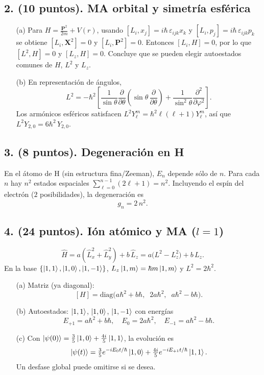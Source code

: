 \documentclass[a4paper,11pt]{article}
\begin{document}
\subsection*{2. (10 puntos). MA orbital y simetría esférica}
\begin{enumerate}
  \item[(a)] Para $H=\tfrac{\mathbf{P}^2}{2m}+V(r)$, usando $[L_i,x_j]=i\hbar\,\varepsilon_{ijk}x_k$ y $[L_i,p_j]=i\hbar\,\varepsilon_{ijk}p_k$ se obtiene $[L_i,\mathbf{X}^2]=0$ y $[L_i,\mathbf{P}^2]=0$. Entonces $[L_i,H]=0$, por lo que $[L^2,H]=0$ y $[L_z,H]=0$. Concluye que se pueden elegir autoestados comunes de $H$, $L^2$ y $L_z$.
  \item[(b)] En representación de ángulos,
  \[
  L^2=-\hbar^2\!\left[\frac{1}{\sin\theta}\frac{\partial}{\partial \theta}\!\left(\sin\theta\,\frac{\partial}{\partial \theta}\right)+\frac{1}{\sin^2\theta}\frac{\partial^2}{\partial \varphi^2}\right].
  \]
  Los armónicos esféricos satisfacen $L^2Y_\ell^m=\hbar^2\ell(\ell\!+\!1)Y_\ell^m$, así que $L^2 Y_{2,0}=6\hbar^2\,Y_{2,0}$.
\end{enumerate}

\subsection*{3. (8 puntos). Degeneración en H}
En el átomo de H (sin estructura fina/Zeeman), $E_n$ depende sólo de $n$. Para cada $n$ hay $n^2$ estados espaciales $\sum_{\ell=0}^{n-1}(2\ell+1)=n^2$. Incluyendo el espín del electrón ($2$ posibilidades), la degeneración es
\[
g_n=2\,n^2.
\]

\subsection*{4. (24 puntos). Ión atómico y MA ($l=1$)}
\[
\hat H=a(\hat L_x^2+\hat L_y^2)+b\,\hat L_z=a\big(L^2-L_z^2\big)+b\,L_z.
\]
En la base $\{\ket{1,1},\ket{1,0},\ket{1,-1}\}$, $L_z\ket{1,m}=\hbar m\ket{1,m}$ y $L^2=2\hbar^2$.
\begin{enumerate}
  \item[(a)] Matriz (ya diagonal):
  \[
  [H]=\mathrm{diag}\big(a\hbar^2+b\hbar,\;\;2a\hbar^2,\;\;a\hbar^2-b\hbar\big).
  \]
  \item[(b)] Autoestados: $\ket{1,1}$, $\ket{1,0}$, $\ket{1,-1}$ con energías
  \[
  E_{+1}=a\hbar^2+b\hbar,\quad E_{0}=2a\hbar^2,\quad E_{-1}=a\hbar^2-b\hbar.
  \]
  \item[(c)] Con
  $\ket{\psi(0)}=\tfrac{3}{5}\ket{1,0}+\tfrac{4i}{5}\ket{1,1}$,
  la evolución es
  \[
  \ket{\psi(t)}=\tfrac{3}{5}e^{-iE_0 t/\hbar}\ket{1,0}+\tfrac{4i}{5}e^{-iE_{+1} t/\hbar}\ket{1,1}.
  \]
  Un desfase global puede omitirse si se desea.
\end{enumerate}
\end{document}
